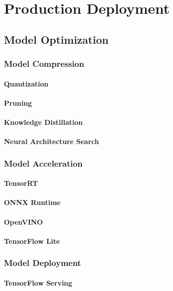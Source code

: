 \part{Production Deployment}

\chapter{Model Optimization}
\section{Model Compression}
\subsection{Quantization}
\subsection{Pruning}
\subsection{Knowledge Distillation}
\subsection{Neural Architecture Search}
\section{Model Acceleration}
\subsection{TensorRT}
\subsection{ONNX Runtime}
\subsection{OpenVINO}
\subsection{TensorFlow Lite}
\section{Model Deployment}
\subsection{TensorFlow Serving}
